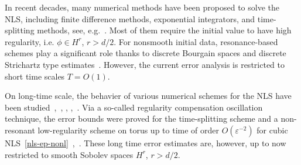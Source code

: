\documentclass[10pt,a4paper]{article}
\begin{document}
  In recent decades, many numerical methods have been proposed to solve the NLS,
  including finite difference methods, exponential integrators, and time-splitting
  methods, see, e.g.~\cite{BDDLV21,HO10,BDD02,Lub08,Tha12}.
  Most of them require the initial value to have high regularity, i.e. \(\phi
  \in H^r\), \(r>d/2\). For nonsmooth initial data, resonance-based schemes play
  a significant role thanks to discrete Bourgain spaces and discrete Strichartz
  type estimates~\cite{ORS21,ORS22b}. However, the current error analysis is restricted to
  short time scales \(T=O(1)\).

  On long-time scale, the behavier of various
  numerical schemes for the NLS have been 
  studied~\cite{CCMM15},~\cite{FGP10}, \cite{FGP10b}, \cite{GL10},~\cite{GL10b}. 
  Via a so-called regularity compensation oscillation technique, the 
  error bounds were proved for the time-splitting scheme and a non-resonant
  low-regularity scheme on torus up to time of order \(O(\varepsilon^{-2})\) for cubic
  NLS~\eqref{nls-ep-nonl}~\cite{BCF},~\cite{FMS23}.
  These long time error estimates are, however, up to now restricted to smooth
  Sobolev spaces \(H^r\), \(r>d/2\). 
\end{document}
